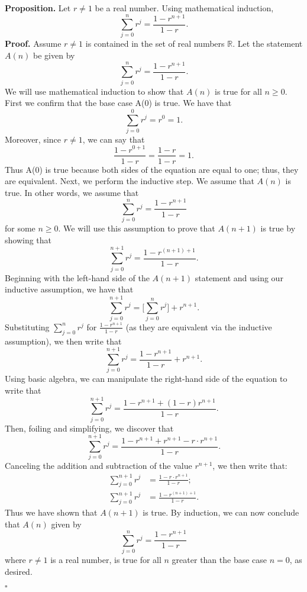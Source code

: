 \documentclass[12pt]{exam}
\begin{document}
\begin{questions}


\question
\textbf{Proposition.} Let $r \neq 1$ be a real number. Using mathematical induction, $$\sum_{j=0}^n r^j = \frac{1-r^{n+1}}{1-r}.$$
\textbf{Proof.} Assume $r \neq 1$ is contained in the set of real numbers $\mathbb R$. Let the statement $A(n)$ be given by $$\sum_{j=0}^n r^j = \frac{1-r^{n+1}}{1-r}.$$ We will use mathematical induction to show that $A(n)$ is true for all $n\geq 0$. First we confirm that the base case A(0) is true. We have that $$\sum_{j=0}^0 r^j = r^0 = 1.$$ Moreover, since $r \neq 1$, we can say that $$\frac{1-r^{0+1}}{1-r} =\frac{1-r}{1-r} = 1.$$ Thus A(0) is true because both sides of the equation are equal to one; thus, they are equivalent. Next, we perform the inductive step. We assume that $A(n)$ is true. In other words, we assume that $$\sum_{j=0}^n r^j = \frac{1-r^{n+1}}{1-r} $$ for some $n\geq 0$. We will use this assumption to prove that $A(n+1)$ is true by showing that $$\sum_{j=0}^{n+1} r^j = \frac{1-r^{(n+1)+1}}{1-r}. $$
Beginning with the left-hand side of the $A(n+1)$ statement and using our inductive assumption, we have that $$\sum_{j=0}^{n+1} r^j = \Bigg[ \sum_{j=0}^{n} r^j \Bigg] + r^{n+1}.$$ Substituting $\sum_{j=0}^n r^j$ for $ \frac{1-r^{n+1}}{1-r} $ (as they are equivalent via the inductive assumption), we then write that $$\sum_{j=0}^{n+1} r^j =  \frac{1-r^{n+1}}{1-r} + r^{n+1}.$$ Using basic algebra, we can manipulate the right-hand side of the equation to write that $$\sum_{j=0}^{n+1} r^j =  \frac{1-r^{n+1} + (1-r)r^{n+1}}{1-r}.$$ Then, foiling and simplifying, we discover that $$\sum_{j=0}^{n+1} r^j =  \frac{1-r^{n+1} + r^{n+1} -r\cdot r^{n+1}}{1-r}.$$ Canceling the addition and subtraction of the value $r^{n+1}$, we then write that:
\begin{align*}
\sum_{j=0}^{n+1} r^j &=  \frac{1 -r\cdot r^{n+1}}{1-r}; \\
\sum_{j=0}^{n+1} r^j &=  \frac{1 -r^{(n+1)+1}}{1-r}.
\end{align*}
Thus we have shown that $A(n+1)$ is true. By induction, we can now conclude that $A(n)$ given by $$\sum_{j=0}^n r^j = \frac{1-r^{n+1}}{1-r} $$ where $r \neq 1$ is a real number, is true for all $n$ greater than the base case $n=0$, as desired.
\begin{flushright}
$\square$
\end{flushright}


\end{questions}
\end{document}
